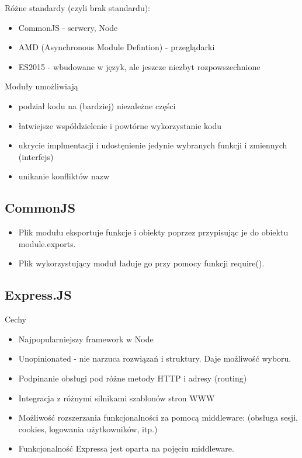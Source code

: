 \documentclass[../main.tex]{subfiles}
\begin{document}
    Różne standardy (czyli brak standardu):
    \begin{itemize}
        \item CommonJS - serwery, Node
        \item AMD (Asynchronous Module Defintion) - przeglądarki
        \item ES2015 - wbudowane w język, ale jeszcze niezbyt rozpowszechnione
    \end{itemize}

    Moduły umożliwiają
    \begin{itemize}
        \item podział kodu na (bardziej) niezależne części
        \item łatwiejsze współdzielenie i powtórne wykorzystanie kodu
        \item ukrycie implmentacji i udostęnienie jedynie wybranych funkcji i zmiennych (interfejs)
        \item unikanie konfliktów nazw
    \end{itemize}

    \subsection{CommonJS}
    \begin{itemize}
        \item Plik modułu eksportuje funkcje i obiekty poprzez przypisując je do obiektu module.exports.
        \item Plik wykorzystujący moduł ładuje go przy pomocy funkcji require().
    \end{itemize}

    \subsection{Express.JS}
    Cechy
    \begin{itemize}
        \item Najpopularniejszy framework w Node
        \item Unopinionated - nie narzuca rozwiązań i struktury. Daje możliwość wyboru.
        \item Podpinanie obsługi pod różne metody HTTP i adresy (routing)
        \item Integracja z różnymi silnikami szablonów stron WWW
        \item Możliwość rozszerzania funkcjonalności za pomocą middleware: (obsługa sesji, cookies, logowania użytkowników, itp.)
        \item Funkcjonalność Expressa jest oparta na pojęciu middleware.
    \end{itemize}
\end{document}
